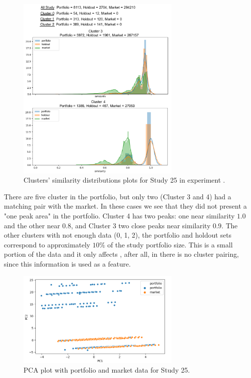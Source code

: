 \begin{figure}[!ht]
   \centering
   \includegraphics[width=8cm]{fig/ch4-study-25-clusters-simi-plot.png}
   \caption{Clusters' similarity distributions plots for Study 25 in experiment \nameExperimentI{}.}
   \label{fig:study-25-clusters-simi-plot}
\end{figure}

There are five cluster in the portfolio, but only two (Cluster 3 and 4) had a matching pair with the market. In these cases we see that they did not present a "one peak area" in the portfolio. Cluster 4 has two peaks: one near similarity $1.0$ and the other near $0.8$, and Cluster 3 two close peaks near similarity $0.9$. The other clusters with not enough data (0, 1, 2), the portfolio and holdout sets correspond to approximately $10\%$ of the study portfolio size. This is a small portion of the data and it only affects \nameExperimentI{}, after all, in \nameExperimentII{} there is no cluster pairing, since this information is used as a feature.

\begin{figure}[!ht]
   \centering
   \includegraphics[width=8cm]{fig/ch4-study-25-pca.png}
   \caption{PCA plot with portfolio and market data for Study 25.}
   \label{fig:study-25-pca}
\end{figure}

